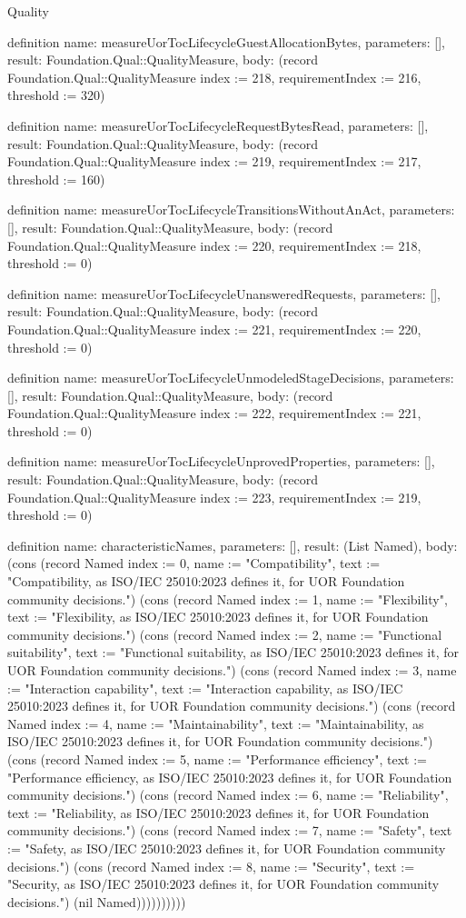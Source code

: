 \begin{lexlean}{Quality}
\begin{semanticmodule}
definition{
  name: measureUorTocLifecycleGuestAllocationBytes,
  parameters: [],
  result: Foundation.Qual::QualityMeasure,
  body: (record Foundation.Qual::QualityMeasure {index := 218, requirementIndex := 216, threshold := 320})
}

definition{
  name: measureUorTocLifecycleRequestBytesRead,
  parameters: [],
  result: Foundation.Qual::QualityMeasure,
  body: (record Foundation.Qual::QualityMeasure {index := 219, requirementIndex := 217, threshold := 160})
}

definition{
  name: measureUorTocLifecycleTransitionsWithoutAnAct,
  parameters: [],
  result: Foundation.Qual::QualityMeasure,
  body: (record Foundation.Qual::QualityMeasure {index := 220, requirementIndex := 218, threshold := 0})
}

definition{
  name: measureUorTocLifecycleUnansweredRequests,
  parameters: [],
  result: Foundation.Qual::QualityMeasure,
  body: (record Foundation.Qual::QualityMeasure {index := 221, requirementIndex := 220, threshold := 0})
}

definition{
  name: measureUorTocLifecycleUnmodeledStageDecisions,
  parameters: [],
  result: Foundation.Qual::QualityMeasure,
  body: (record Foundation.Qual::QualityMeasure {index := 222, requirementIndex := 221, threshold := 0})
}

definition{
  name: measureUorTocLifecycleUnprovedProperties,
  parameters: [],
  result: Foundation.Qual::QualityMeasure,
  body: (record Foundation.Qual::QualityMeasure {index := 223, requirementIndex := 219, threshold := 0})
}

definition{
  name: characteristicNames,
  parameters: [],
  result: (List Named),
  body: (cons (record Named {index := 0, name := "Compatibility", text := "Compatibility, as ISO/IEC 25010:2023 defines it, for UOR Foundation community decisions."}) (cons (record Named {index := 1, name := "Flexibility", text := "Flexibility, as ISO/IEC 25010:2023 defines it, for UOR Foundation community decisions."}) (cons (record Named {index := 2, name := "Functional suitability", text := "Functional suitability, as ISO/IEC 25010:2023 defines it, for UOR Foundation community decisions."}) (cons (record Named {index := 3, name := "Interaction capability", text := "Interaction capability, as ISO/IEC 25010:2023 defines it, for UOR Foundation community decisions."}) (cons (record Named {index := 4, name := "Maintainability", text := "Maintainability, as ISO/IEC 25010:2023 defines it, for UOR Foundation community decisions."}) (cons (record Named {index := 5, name := "Performance efficiency", text := "Performance efficiency, as ISO/IEC 25010:2023 defines it, for UOR Foundation community decisions."}) (cons (record Named {index := 6, name := "Reliability", text := "Reliability, as ISO/IEC 25010:2023 defines it, for UOR Foundation community decisions."}) (cons (record Named {index := 7, name := "Safety", text := "Safety, as ISO/IEC 25010:2023 defines it, for UOR Foundation community decisions."}) (cons (record Named {index := 8, name := "Security", text := "Security, as ISO/IEC 25010:2023 defines it, for UOR Foundation community decisions."}) (nil Named))))))))))
}


\end{semanticmodule}
\end{lexlean}
